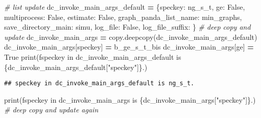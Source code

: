 \documentclass[
]{book}
\newenvironment{Shaded}{\begin{snugshade}}{\end{snugshade}}
\newcommand{\BuiltInTok}[1]{#1}
\newcommand{\CommentTok}[1]{\textcolor[rgb]{0.56,0.35,0.01}{\textit{#1}}}
\newcommand{\NormalTok}[1]{#1}
\newcommand{\OperatorTok}[1]{\textcolor[rgb]{0.81,0.36,0.00}{\textbf{#1}}}
\newcommand{\SpecialCharTok}[1]{\textcolor[rgb]{0.00,0.00,0.00}{#1}}
\newcommand{\SpecialStringTok}[1]{\textcolor[rgb]{0.31,0.60,0.02}{#1}}
\newcommand{\StringTok}[1]{\textcolor[rgb]{0.31,0.60,0.02}{#1}}
\newcommand{\VariableTok}[1]{\textcolor[rgb]{0.00,0.00,0.00}{#1}}
\begin{document}
\begin{Shaded}
\begin{Highlighting}[]
\CommentTok{\# list update}
\NormalTok{dc\_invoke\_main\_args\_default }\OperatorTok{=}\NormalTok{ \{}\StringTok{\textquotesingle{}speckey\textquotesingle{}}\NormalTok{: }\StringTok{\textquotesingle{}ng\_s\_t\textquotesingle{}}\NormalTok{,}
                               \StringTok{\textquotesingle{}ge\textquotesingle{}}\NormalTok{: }\VariableTok{False}\NormalTok{,}
                               \StringTok{\textquotesingle{}multiprocess\textquotesingle{}}\NormalTok{: }\VariableTok{False}\NormalTok{,}
                               \StringTok{\textquotesingle{}estimate\textquotesingle{}}\NormalTok{: }\VariableTok{False}\NormalTok{,}
                               \StringTok{\textquotesingle{}graph\_panda\_list\_name\textquotesingle{}}\NormalTok{: }\StringTok{\textquotesingle{}min\_graphs\textquotesingle{}}\NormalTok{,}
                               \StringTok{\textquotesingle{}save\_directory\_main\textquotesingle{}}\NormalTok{: }\StringTok{\textquotesingle{}simu\textquotesingle{}}\NormalTok{,}
                               \StringTok{\textquotesingle{}log\_file\textquotesingle{}}\NormalTok{: }\VariableTok{False}\NormalTok{,}
                               \StringTok{\textquotesingle{}log\_file\_suffix\textquotesingle{}}\NormalTok{: }\StringTok{\textquotesingle{}\textquotesingle{}}\NormalTok{\}}
\CommentTok{\# deep copy and update}
\NormalTok{dc\_invoke\_main\_args }\OperatorTok{=}\NormalTok{ copy.deepcopy(dc\_invoke\_main\_args\_default)}
\NormalTok{dc\_invoke\_main\_args[}\StringTok{\textquotesingle{}speckey\textquotesingle{}}\NormalTok{] }\OperatorTok{=} \StringTok{\textquotesingle{}b\_ge\_s\_t\_bis\textquotesingle{}}
\NormalTok{dc\_invoke\_main\_args[}\StringTok{\textquotesingle{}ge\textquotesingle{}}\NormalTok{] }\OperatorTok{=} \VariableTok{True}
\BuiltInTok{print}\NormalTok{(}\SpecialStringTok{f\textquotesingle{}speckey in dc\_invoke\_main\_args\_default is }\SpecialCharTok{\{}\NormalTok{dc\_invoke\_main\_args\_default[}\StringTok{"speckey"}\NormalTok{]}\SpecialCharTok{\}}\SpecialStringTok{.\textquotesingle{}}\NormalTok{)}
\end{Highlighting}
\end{Shaded}

\begin{verbatim}
## speckey in dc_invoke_main_args_default is ng_s_t.
\end{verbatim}

\begin{Shaded}
\begin{Highlighting}[]
\BuiltInTok{print}\NormalTok{(}\SpecialStringTok{f\textquotesingle{}speckey in dc\_invoke\_main\_args is }\SpecialCharTok{\{}\NormalTok{dc\_invoke\_main\_args[}\StringTok{"speckey"}\NormalTok{]}\SpecialCharTok{\}}\SpecialStringTok{.\textquotesingle{}}\NormalTok{)}
\CommentTok{\# deep copy and update again}
\end{Highlighting}
\end{Shaded}
\end{document}
